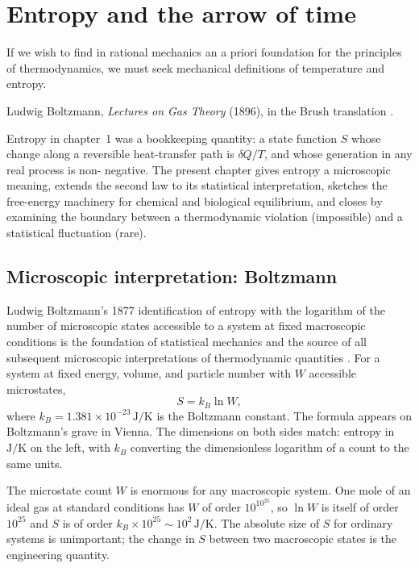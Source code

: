 \chapter{Entropy and the arrow of time}
\label{vol04:ch04}

\epigraph{If we wish to find in rational mechanics an a priori
foundation for the principles of thermodynamics, we must seek
mechanical definitions of temperature and entropy.}{Ludwig Boltzmann,
\emph{Lectures on Gas Theory} (1896), in the Brush translation
\cite[p.~5]{hist:boltzmann1896}.}


\noindent
Entropy in chapter~1 was a bookkeeping quantity: a state function
$S$ whose change along a reversible heat-transfer path is
$\delta Q/T$, and whose generation in any real process is non-
negative. The present chapter gives entropy a microscopic meaning,
extends the second law to its statistical interpretation, sketches
the free-energy machinery for chemical and biological equilibrium,
and closes by examining the boundary between a thermodynamic
violation (impossible) and a statistical fluctuation (rare).

\section{Microscopic interpretation: Boltzmann}

Ludwig Boltzmann's 1877 identification of entropy with the logarithm
of the number of microscopic states accessible to a system at fixed
macroscopic conditions is the foundation of statistical mechanics
and the source of all subsequent microscopic interpretations of
thermodynamic quantities \cite{hist:boltzmann1896}. For a system at
fixed energy, volume, and particle number with $W$ accessible
microstates,
\[
S = k_B \ln W,
\]
where $k_B = 1.381 \times 10^{-23}\,\text{J}/\si{\kelvin}$ is the
Boltzmann constant. The formula appears on Boltzmann's grave in
Vienna. The dimensions on both sides match: entropy in $\text{J}/
\si{\kelvin}$ on the left, with $k_B$ converting the dimensionless
logarithm of a count to the same units.

The microstate count $W$ is enormous for any macroscopic system.
One mole of an ideal gas at standard conditions has $W$ of order
$10^{10^{25}}$, so $\ln W$ is itself of order $10^{25}$ and $S$ is of
order $k_B \times 10^{25} \sim 10^2\,\text{J}/\si{\kelvin}$. The
absolute size of $S$ for ordinary systems is unimportant; the change
in $S$ between two macroscopic states is the engineering quantity.

